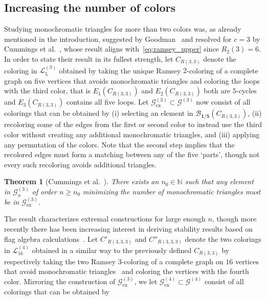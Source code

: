 \documentclass[a4paper,11pt]{article}
\newtheorem{theorem}{Theorem}[section]
\numberwithin{equation}{section}
\newcommand{\mB}{\mathcal{B}}
\newcommand{\mG}{\mathcal{G}}
\newcommand{\mL}{\mathcal{L}}
\newcommand{\NN}{\mathbb{N}}
\begin{document}
\subsection{Increasing the number of colors}\label{sec:more_colors_intro}

Studying monochromatic triangles for more than two colors was, as already mentioned in the introduction, suggested by Goodman~\cite{Goodman_1985} and resolved for $c = 3$ by Cummings et al.~\cite{CummingsEtAl_2013}, whose result aligns with~\cref{eq:ramsey_upper} since $R_2(3) = 6$. In order to state their result in its fullest strength, let $C_{R(3,3)}$ denote the coloring in $\mL^{(3)}_{5}$ obtained by taking the unique Ramsey $2$-coloring of a complete graph on five vertices that avoids monochromatic triangles and coloring the loops with the third color, that is $E_1 (C_{R(3,3)} )$ and $E_2 (C_{R(3,3)} )$ both are $5$-cycles and $E_3 (C_{R(3,3)} )$ contains all five loops. Let 
$\mG^{(3)}_\textrm{ex} \subset \mG^{(3)}$ now consist of all colorings that can be obtained by (i) selecting an element in $\mB_\mathbf{1/5} (C_{R(3,3)} )$, (ii) recoloring some of the edges from the first or second color to instead use the third color without creating any additional monochromatic triangles, and (iii) applying any permutation of the colors. Note that the second step implies that the recolored edges must form a matching between any of the five {\lq}parts{\rq}, though not every such recoloring avoids additional triangles.
%
\begin{theorem}[Cummings et al.~\cite{CummingsEtAl_2013}]
    There exists an $n_0 \in \NN$ such that any 
    element in $\mG_n^{(3)}$ of order $n \geq n_0$ minimizing the number of monochromatic triangles must be in $\mG^{(3)}_\textrm{ex}$.
\end{theorem}
%
The result characterizes extremal constructions for large enough $n$, though more recently
there has been increasing interest in deriving stability results based on flag algebra calculations~\cite{PikhurkoEtAl_2019}. Let $C'_{R(3,3,3)}$ and $C''_{R(3,3,3)}$ denote the two colorings in $\mL^{(4)}_{16}$ obtained in a similar way to the previously defined $C_{R(3,3)}$ by respectively taking the two Ramsey $3$-coloring of a complete graph on $16$ vertices that avoid monochromatic triangles~\cite{greenwood1955combinatorial, kalbfleisch1968maximal, laywine1988simple, radziszowski2011small} and coloring the vertices with the fourth color. Mirroring the construction of $\mG^{(3)}_\textrm{ex}$, we let $\mG^{(4)}_\textrm{ex} \subset \mG^{(4)}$ consist of all colorings that can be obtained by
\end{document}
